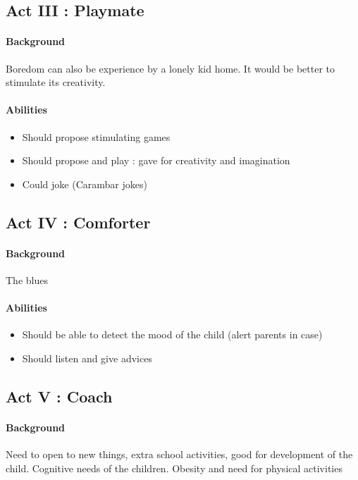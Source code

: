 \subsection{Act III : Playmate}
\paragraph{Background}
Boredom can also be experience by a lonely kid home. 
It would be better to stimulate its creativity. 
\paragraph{Abilities}
\begin{itemize}
\item Should propose stimulating games
\item Should propose and play : gave for creativity and imagination
\item Could joke (Carambar jokes)
\end{itemize}

\subsection{Act IV : Comforter}
\paragraph{Background}
The blues
\paragraph{Abilities}
\begin{itemize}
\item Should be able to detect the mood of the child (alert parents in case)
\item Should listen and give advices
\end{itemize}


\subsection{Act V : Coach}
\paragraph{Background}

Need to open to new things, extra school activities, good for development of the child. 
Cognitive needs of the children. 
Obesity and need for physical activities

